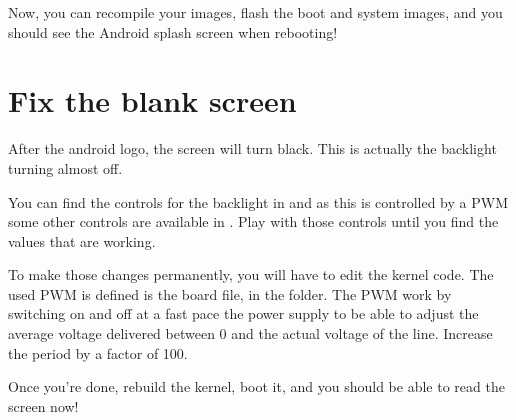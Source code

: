 Now, you can recompile your images, flash the boot and system images,
and you should see the Android splash screen when rebooting!

\section{Fix the blank screen}

After the android logo, the screen will turn black. This is actually
the backlight turning almost off.

You can find the controls for the backlight in
 and as this is controlled by a PWM some
other controls are available in . Play with those
controls until you find the values that are working.

To make those changes permanently, you will have to edit the kernel
code. The used PWM is defined is the  board file, in
the  folder. The PWM work by switching on
and off at a fast pace the power supply to be able to adjust the
average voltage delivered between 0 and the actual voltage of the
line. Increase the period by a factor of 100.

Once you're done, rebuild the kernel, boot it, and you should be able
to read the screen now!


